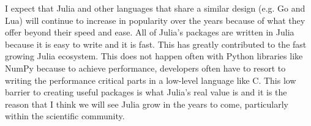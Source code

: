 I expect that Julia and other languages that share a similar design (e.g. Go and Lua) will continue to increase in popularity over the years because of what they offer beyond their speed and ease.
All of Julia's packages are written in Julia because it is easy to write and it is fast.
This has greatly contributed to the fast growing Julia ecosystem.
This does not happen often with Python libraries like NumPy because to achieve performance, developers often have to resort to writing the performance critical parts in a low-level language like C.
This low barrier to creating useful packages is what Julia's real value is and it is the reason that I think we will see Julia grow in the years to come, particularly within the scientific community.
